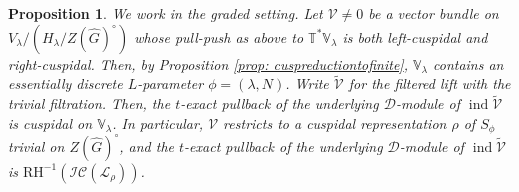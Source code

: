 \documentclass{amsart}
\newtheorem{proposition}[theorem]{Proposition}
\theoremstyle{definition}
\theoremstyle{remark}
\numberwithin{equation}{section}
\DeclareMathOperator{\ind}{\mathrm{ind}}
\newcommand{\mc}{\mathcal}
\newcommand{\RH}{\mathrm{RH}}
\newcommand{\wh}{\widehat}
\newcommand{\V}{\mathbb{V}}
\newcommand{\T}{\mathbb{T}}
\begin{document}
\begin{proposition}{\label{prop: CVBimpliesCLS}}
We work in the graded setting. Let $\mc V\neq 0$ be a vector bundle on $V_\lambda / (H_\lambda/ Z(\wh G)^{\circ})$ whose pull-push as above to $\T^*\V_\lambda$ is both left-cuspidal and right-cuspidal. Then, by Proposition \ref{prop: cuspreductiontofinite}, $\V_{\lambda}$ contains an essentially discrete $L$-parameter $\phi=(\lambda, N)$. Write $\widetilde{\mc V}$ for the filtered lift with the trivial filtration. Then, the $t$-exact pullback of the underlying $\mc D$-module of $\ind \widetilde{\mc V}$ is cuspidal on $\V_\lambda$. In particular, $\mc V$ restricts to a cuspidal representation $\rho$ of $S_\phi$ trivial on $Z(\wh G)^{\circ}$, and the $t$-exact pullback of the underlying $\mc D$-module of $\ind \widetilde{\mc V}$ is $\RH^{-1}(\mc{IC}(\mc L_\rho))$.
\end{proposition}
\end{document}
